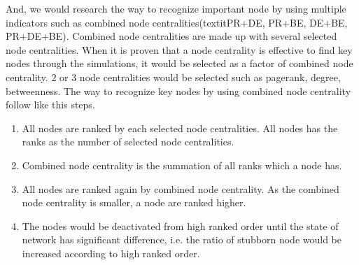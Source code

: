 And, we would research the way to recognize important node by using multiple indicators such as combined node centralities(textit{PR+DE, PR+BE, DE+BE, PR+DE+BE}). Combined node centralities are made up with several selected node centralities. When it is proven that a node centrality is effective to find key nodes through the simulations, it would be selected as a factor of combined node centrality. $2$ or $3$ node centralities would be selected such as pagerank, degree, betweenness. 
The way to recognize key nodes by using combined node centrality follow like this steps. 
\begin{enumerate}
	\item All nodes are ranked by each selected node centralities. All nodes has the ranks as the number of selected node centralities.  
	\item Combined node centrality is the summation of all ranks which a node has. 
	\item All nodes are ranked again by combined node centrality. As the combined node centrality is smaller, a node are ranked higher.        
	\item The nodes would be deactivated from high ranked order until the state of network has significant difference, i.e. the ratio of stubborn node would be increased according to high ranked order. 
\end{enumerate}
 
